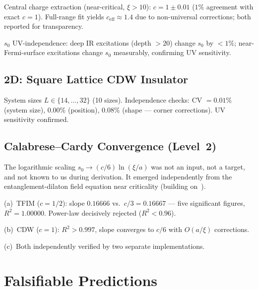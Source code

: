\documentclass[aps,prd,twocolumn,superscriptaddress,nofootinbib,floatfix]{revtex4-2}
\newcommand{\sn}{s_0}
\begin{document}
Central charge extraction (near-critical, $\xi > 10$): $c = 1 \pm 0.01$ ($1\%$ agreement with exact $c = 1$). Full-range fit yields $c_{\mathrm{eff}} \approx 1.4$ due to non-universal corrections; both reported for transparency.

$\sn$ UV-independence: deep IR excitations (depth $> 20$) change $\sn$ by $< 1\%$; near-Fermi-surface excitations change $\sn$ measurably, confirming UV sensitivity.

\subsection{2D: Square Lattice CDW Insulator}

System sizes $L \in \{14, \ldots, 32\}$ (10 sizes). Independence checks: CV $= 0.01\%$ (system size), $0.00\%$ (position), $0.08\%$ (shape --- corner corrections). UV sensitivity confirmed.

\subsection{Calabrese--Cardy Convergence (Level~2)}

The logarithmic scaling $\sn \to (c/6)\ln(\xi/a)$ was not an input, not a target, and not known to us during derivation. It emerged independently from the entanglement-dilaton field equation near criticality (building on~\cite{CalabreseCardy2004,HolzheyLarsenWilczek1994}).

(a)~TFIM ($c = 1/2$): slope $0.16666$ vs.\ $c/3 = 0.16667$ --- five significant figures, $R^2 = 1.00000$. Power-law decisively rejected ($R^2 < 0.96$).

(b)~CDW ($c = 1$): $R^2 > 0.997$, slope converges to $c/6$ with $O(a/\xi)$ corrections.

(c)~Both independently verified by two separate implementations.

\section{Falsifiable Predictions}
\label{sec:predictions}
\end{document}
